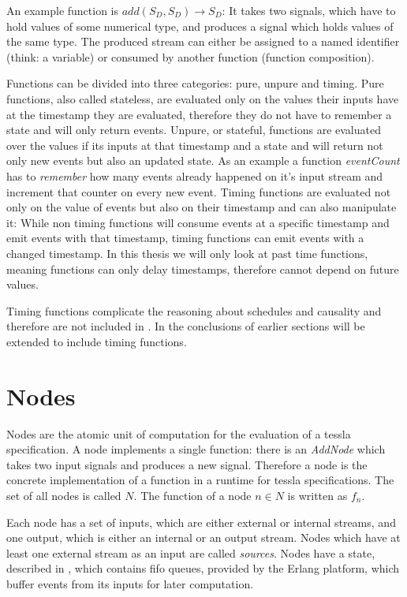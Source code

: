 An example function is \(\mathit{add}(S_D,S_D) \rightarrow S_D\): It takes two signals, which have to hold values of some numerical type, and produces a signal which holds values of the same type.
The produced stream can either be assigned to a named identifier (think: a variable) or consumed by another function (function composition).

Functions can be divided into three categories: pure, unpure and timing.
Pure functions, also called stateless, are evaluated only on the values their inputs have at the timestamp they are evaluated, therefore they do not have to remember a state and will only return events.
Unpure, or stateful, functions are evaluated over the values if its inputs at that timestamp and a state and will return not only new events but also an updated state.
As an example a function \emph{eventCount} has to \emph{remember} how many events already happened on it's input stream and increment that counter on every new event.
Timing functions are evaluated not only on the value of events but also on their timestamp and can also manipulate it:
While non timing functions will consume events at a specific timestamp and emit events with that timestamp, timing functions can emit events with a changed timestamp.
In this thesis we will only look at past time functions, meaning functions can only delay timestamps, therefore cannot depend on future values.

Timing functions complicate the reasoning about schedules and causality and therefore are not included in .
In  the conclusions of earlier sections will be extended to include timing functions.

\section{Nodes}
\label{sec:definitions:nodes}

Nodes are the atomic unit of computation for the evaluation of a \gls{tessla} specification.
A node implements a single function: there is an \emph{AddNode} which takes two input signals and produces a new signal.
Therefore a node is the concrete implementation of a function in a runtime for \gls{tessla} specifications.
The set of all nodes is called \(N\).
The function of a node \(n \in N\) is written as \(f_n\).

Each node has a set of inputs, which are either external or internal streams, and one output, which is either an internal or an output stream.
Nodes which have at least one external stream as an input are called \emph{sources}.
Nodes have a state, described in , which contains \gls{fifo} queues, provided by the Erlang platform, which buffer events from its inputs for later computation.

